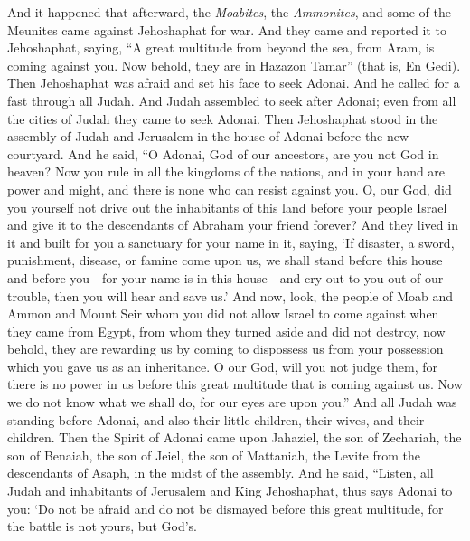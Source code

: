 \begin{biblechapter} %
 And it happened that afterward, the \textit{Moabites}, the \textit{Ammonites}, and some of the Meunites came against Jehoshaphat for war.
\verse And they came and reported it to Jehoshaphat, saying, “A great multitude from beyond the sea, from Aram, is coming against you. Now behold, they are in Hazazon Tamar” (that is, En Gedi).
\verse Then Jehoshaphat was afraid and set his face to seek Adonai. And he called for a fast through all Judah.
\verse And Judah assembled to seek after Adonai; even from all the cities of Judah they came to seek Adonai.
\verse Then Jehoshaphat stood in the assembly of Judah and Jerusalem in the house of Adonai before the new courtyard.
\verse And he said, “O Adonai, God of our ancestors, are you not God in heaven? Now you rule in all the kingdoms of the nations, and in your hand are power and might, and there is none who can resist against you.
\verse O, our God, did you yourself not drive out the inhabitants of this land before your people Israel and give it to the descendants of Abraham your friend forever?
\verse And they lived in it and built for you a sanctuary for your name in it, saying,
\verse ‘If disaster, a sword, punishment, disease, or famine come upon us, we shall stand before this house and before you—for your name is in this house—and cry out to you out of our trouble, then you will hear and save us.’
\verse And now, look, the people of Moab and Ammon and Mount Seir whom you did not allow Israel to come against when they came from Egypt, from whom they turned aside and did not destroy,
\verse now behold, they are rewarding us by coming to dispossess us from your possession which you gave us as an inheritance.
\verse O our God, will you not judge them, for there is no power in us before this great multitude that is coming against us. Now we do not know what we shall do, for our eyes are upon you.”
\verse And all Judah was standing before Adonai, and also their little children, their wives, and their children.
\verse Then the Spirit of Adonai came upon Jahaziel, the son of Zechariah, the son of Benaiah, the son of Jeiel, the son of Mattaniah, the Levite from the descendants of Asaph, in the midst of the assembly.
\verse And he said, “Listen, all Judah and inhabitants of Jerusalem and King Jehoshaphat, thus says Adonai to you: ‘Do not be afraid and do not be dismayed before this great multitude, for the battle is not yours, but God’s.

\end{biblechapter}
